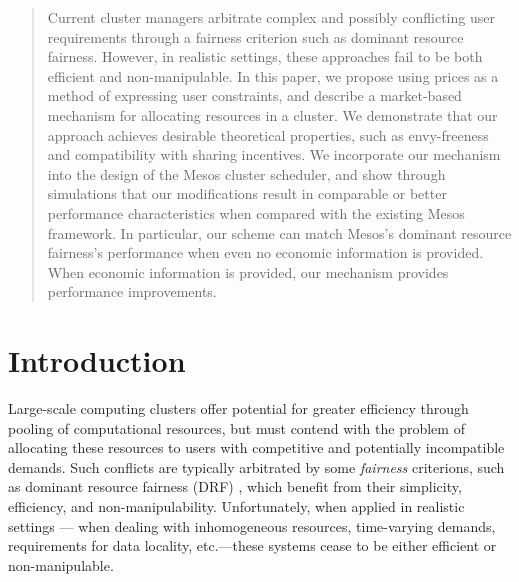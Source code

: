 \documentclass{acm_proc_article-sp}
\begin{document}
\maketitle
\begin{abstract}
Current cluster managers arbitrate complex and possibly conflicting user requirements through a fairness criterion such as dominant resource fairness. However, in realistic settings, these approaches fail to be both efficient and non-manipulable. In this paper, we propose using prices as a method of expressing user constraints, and describe a market-based mechanism for allocating resources in a cluster. We demonstrate that our approach achieves desirable theoretical properties, such as envy-freeness and compatibility with sharing incentives. We incorporate our mechanism into the design of the Mesos cluster scheduler, and show through simulations that our modifications result in comparable or better performance characteristics when compared with the existing Mesos framework. In particular, our scheme can match Mesos's dominant resource fairness's performance when even no economic information is provided. When economic information is provided, our mechanism provides performance improvements.
\end{abstract}




\section{Introduction}
\label{sec:intro}

Large-scale computing clusters offer potential for greater efficiency through
pooling of computational resources, but must contend with the problem of
allocating these resources to users with competitive and potentially
incompatible demands. Such conflicts are typically arbitrated by some \emph{fairness}
criterions, such as dominant resource fairness (DRF) \cite{drf}, which benefit from their
simplicity, efficiency, and non-manipulability. Unfortunately, when applied in
realistic settings --- when dealing with inhomogeneous resources, time-varying
demands, requirements for data locality, etc.---these systems cease to be either
efficient or non-manipulable.
\end{document}
